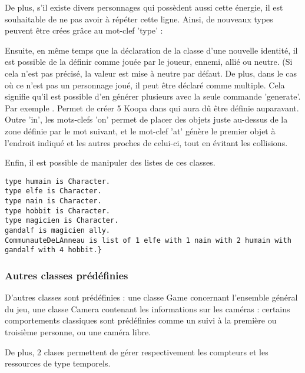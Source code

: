 De plus, s'il existe divers personnages qui possèdent aussi cette énergie, il est souhaitable de ne pas avoir à répéter cette ligne.
Ainsi, de nouveaux types peuvent être crées grâce au mot-clef 'type' :

Ensuite, en même temps que la déclaration de la classe d'une nouvelle identité, il est possible de la définir comme jouée par le joueur, ennemi, allié ou neutre.
(Si cela n'est pas précisé, la valeur est mise à neutre par défaut.
De plus, dans le cas où ce n'est pas un personnage joué, il peut être déclaré comme multiple.
Cela signifie qu'il est possible d'en générer plusieurs avec la seule commande 'generate'.
Par exemple  . Permet de créer 5 Koopa dans  qui aura dû être définie
auparavant. Outre 'in', les mots-clefs 'on' permet de placer des objets juste au-dessus de la zone définie par le mot suivant, et le mot-clef 'at' génère
le premier objet à l'endroit indiqué et les autres proches de celui-ci, tout en évitant les collisions.

Enfin, il est possible de manipuler des listes de ces classes.
\begin{lstlisting}[language=GameGrammar]
type humain is Character. 
type elfe is Character. 
type nain is Character. 
type hobbit is Character. 
type magicien is Character. 
gandalf is magicien ally.
CommunauteDeLAnneau is list of 1 elfe with 1 nain with 2 humain with gandalf with 4 hobbit.}
\end{lstlisting}

\subsubsection{Autres classes prédéfinies}

D'autres classes sont prédéfinies : une classe Game concernant l'ensemble général du jeu, une classe Camera contenant les informations sur les caméras :
certains comportements classiques sont prédéfinies comme un suivi à la première ou troisième personne, ou une caméra libre.

De plus, 2 clases permettent de gérer respectivement les compteurs et les ressources de type temporels.

